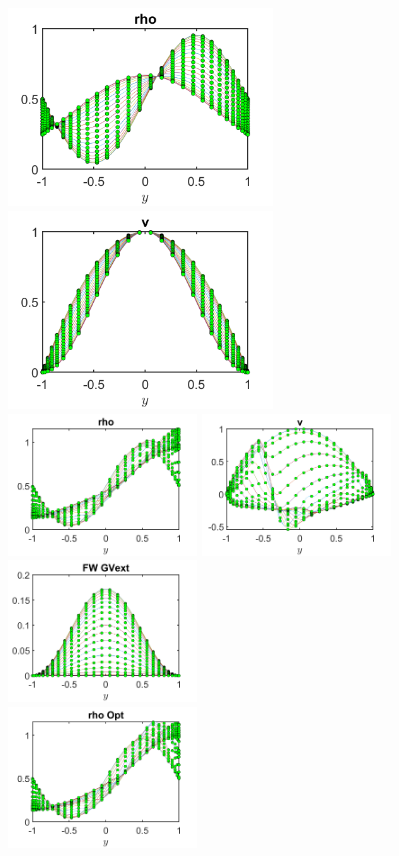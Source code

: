\documentclass[11pt, a4paper]{article}
\theoremstyle{definition}
\begin{document}
\begin{figure}
	\includegraphics[width=7cm]{rhoHat1.png}
	\includegraphics[width=7cm]{vHat1.png}\\
	\includegraphics[width=5cm]{FWrho1.png}
	\includegraphics[width=5cm]{FWv1.png}
	\includegraphics[width=5cm]{FWCont1.png}\\
	\includegraphics[width=5cm]{Optrho1.png}

\end{figure}
\end{document}

